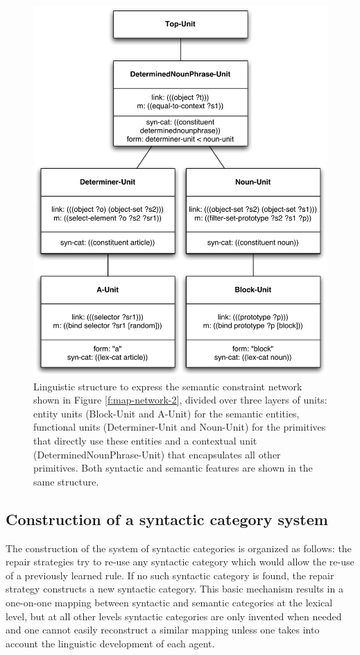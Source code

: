 \begin{figure}[htbp]
  \begin{center}
    \includegraphics[width=.8\textwidth]{./composition/figures/learning-2.pdf}
    \caption[Second linguistic structure to express semantic
    constraint networks]{Linguistic structure to express the semantic
      constraint network shown in Figure \ref{f:map-network-2},
      divided over three layers of units: entity units (Block-Unit and
      A-Unit) for the semantic entities, functional units
      (Determiner-Unit and Noun-Unit) for the primitives that directly
      use these entities and a contextual unit
      (DeterminedNounPhrase-Unit) that encapsulates all other
      primitives. Both syntactic and semantic features are shown in
      the same structure.}
    \label{f:map-structure-2}
  \end{center}
\end{figure}

\subsection{Construction of a syntactic category system}
\label{s:construction-syntactic-category-system}

The construction of the system of syntactic categories is organized as
follows: the repair strategies try to re-use any syntactic category
which would allow the re-use of a previously learned rule. If no such
syntactic category is found, the repair strategy constructs a new
syntactic category. This basic mechanism results in a one-on-one
mapping between syntactic and semantic categories at the lexical
level, but at all other levels syntactic categories are only invented
when needed and one cannot easily reconstruct a similar mapping unless
one takes into account the linguistic development of each agent.

